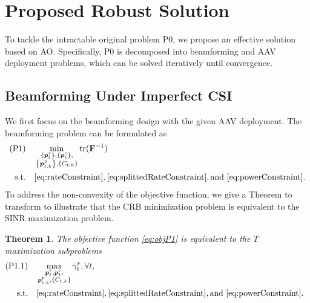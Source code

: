 \documentclass[twocolumn,journal]{IEEEtran}
\newtheorem{theorem}{\textbf{Theorem}}
\begin{document}
\section{Proposed Robust Solution}
To tackle the intractable original problem P0, we propose an effective solution based on AO. Specifically, P0 is decomposed into beamforming and AAV deployment problems, which can be solved iteratively until convergence.
\subsection{Beamforming Under Imperfect CSI}
We first focus on the beamforming design with the given AAV deployment. The beamforming problem can be formulated as
\begin{align}
 (\text{P1})\quad&\min_{
 \substack{\left\{\boldsymbol{p}^{r}_{t}\right\},\left\{\boldsymbol{p}^{c}_{t}\right\},\\
 \left\{\boldsymbol{p}^{p}_{t,k}\right\},\left\{C_{t,k}
 \right\}}
 } \text{tr}(\mathbf{F}^{-1})\label{eq:objP1}\\
 \text{s.t.}\quad& \eqref{eq:rateConstraint}, \eqref{eq:splittedRateConstraint}, \text{and } \eqref{eq:powerConstraint}.\notag
\end{align}
To address the non-convexity of the objective function, we give a Theorem to transform to illustrate that the CRB minimization problem is equivalent to the SINR maximization problem.
\begin{theorem}
 The objective function \eqref{eq:objP1} is equivalent to the \(T\) maximization subproblems
    \begin{align}
 (\text{P1.1})\quad&\mathop{\max}_{\substack{\boldsymbol{p}^{r}_{t},\boldsymbol{p}^{c}_{t},\\
 \boldsymbol{p}^{p}_{t,k},\left\{C_{t,k}\right\}}}\gamma_t^{r}, \forall t,\\
 \text{s.t.}\quad& \eqref{eq:rateConstraint}, \eqref{eq:splittedRateConstraint}, \text{and } \eqref{eq:powerConstraint}.\notag
    \end{align}
\end{theorem}
\end{document}
